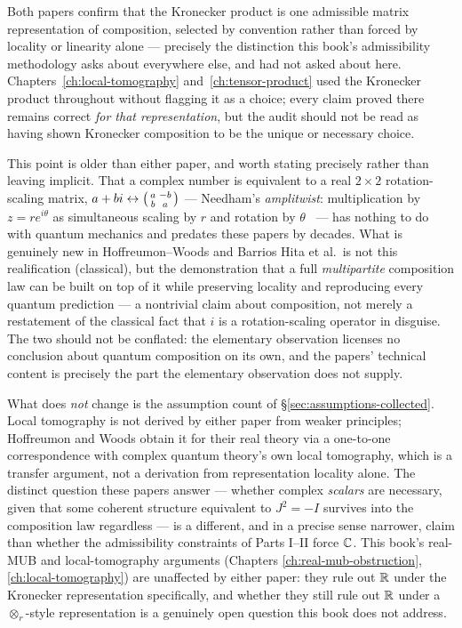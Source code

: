 \begin{remark}
Both papers confirm that the Kronecker product is one admissible matrix
representation of composition, selected by convention rather than forced by
locality or linearity alone — precisely the distinction this book's
admissibility methodology asks about everywhere else, and had not asked about
here. Chapters~\ref{ch:local-tomography} and~\ref{ch:tensor-product} used the
Kronecker product throughout without flagging it as a choice; every claim
proved there remains correct \emph{for that representation}, but the audit
should not be read as having shown Kronecker composition to be the unique or
necessary choice.

This point is older than either paper, and worth stating precisely rather
than leaving implicit. That a complex number is equivalent to a real
$2\times2$ rotation-scaling matrix, $a+bi \leftrightarrow \begin{psmallmatrix}
a&-b\\b&a\end{psmallmatrix}$ — Needham's \emph{amplitwist}: multiplication
by $z=re^{i\theta}$ as simultaneous scaling by $r$ and rotation by
$\theta$~\cite{needham1997} — has nothing to do with quantum mechanics and
predates these papers by decades. What is genuinely new in
Hoffreumon--Woods and Barrios Hita et al.\ is not this realification (classical),
but the demonstration that a full \emph{multipartite} composition law can be
built on top of it while preserving locality and reproducing every quantum
prediction — a nontrivial claim about composition, not merely a restatement
of the classical fact that $i$ is a rotation-scaling operator in disguise.
The two should not be conflated: the elementary observation licenses no
conclusion about quantum composition on its own, and the papers' technical
content is precisely the part the elementary observation does not supply.

What does \emph{not} change is the assumption count of \S\ref{sec:assumptions-collected}.
Local tomography is not derived by either paper from weaker principles;
Hoffreumon and Woods obtain it for their real theory via a one-to-one
correspondence with complex quantum theory's own local tomography, which is
a transfer argument, not a derivation from representation locality alone. The
distinct question these papers answer — whether complex \emph{scalars} are
necessary, given that some coherent structure equivalent to $J^2=-I$ survives
into the composition law regardless — is a different, and in a precise sense
narrower, claim than whether the admissibility constraints of Parts I--II
force $\mathbb{C}$. This book's real-MUB and local-tomography arguments (Chapters
\ref{ch:real-mub-obstruction}, \ref{ch:local-tomography}) are unaffected by
either paper: they rule out $\mathbb{R}$ under the Kronecker representation
specifically, and whether they still rule out $\mathbb{R}$ under a
$\otimes_r$-style representation is a genuinely open question this book does
not address.
\end{remark}

